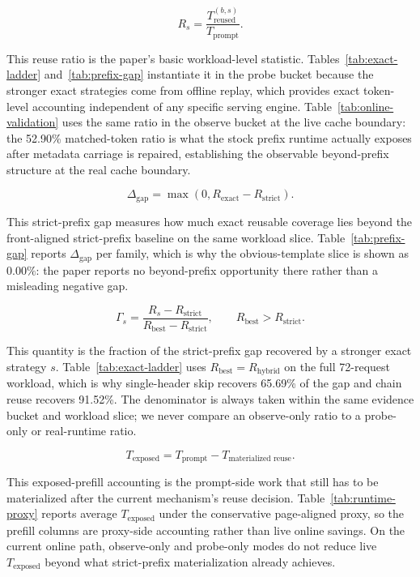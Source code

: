 \documentclass[conference]{IEEEtran}
\begin{document}
\[
R_s = \frac{T_{\text{reused}}^{(b,s)}}{T_{\text{prompt}}}.
\]

This reuse ratio is the paper's basic workload-level statistic. Tables~\ref{tab:exact-ladder} and~\ref{tab:prefix-gap} instantiate it in the probe bucket because the stronger exact strategies come from offline replay, which provides exact token-level accounting independent of any specific serving engine. Table~\ref{tab:online-validation} uses the same ratio in the observe bucket at the live cache boundary: the 52.90\% matched-token ratio is what the stock prefix runtime actually exposes after metadata carriage is repaired, establishing the observable beyond-prefix structure at the real cache boundary.

\[
\Delta_{\text{gap}} = \max\left(0, R_{\text{exact}} - R_{\text{strict}}\right).
\]

This strict-prefix gap measures how much exact reusable coverage lies beyond the front-aligned strict-prefix baseline on the same workload slice. Table~\ref{tab:prefix-gap} reports $\Delta_{\text{gap}}$ per family, which is why the obvious-template slice is shown as $0.00\%$: the paper reports no beyond-prefix opportunity there rather than a misleading negative gap.

\[
\Gamma_s = \frac{R_s - R_{\text{strict}}}{R_{\text{best}} - R_{\text{strict}}}, \qquad R_{\text{best}} > R_{\text{strict}}.
\]

This quantity is the fraction of the strict-prefix gap recovered by a stronger exact strategy $s$. Table~\ref{tab:exact-ladder} uses $R_{\text{best}} = R_{\text{hybrid}}$ on the full 72-request workload, which is why single-header skip recovers 65.69\% of the gap and chain reuse recovers 91.52\%. The denominator is always taken within the same evidence bucket and workload slice; we never compare an observe-only ratio to a probe-only or real-runtime ratio.

\[
T_{\text{exposed}} = T_{\text{prompt}} - T_{\text{materialized reuse}}.
\]

This exposed-prefill accounting is the prompt-side work that still has to be materialized after the current mechanism's reuse decision. Table~\ref{tab:runtime-proxy} reports average $T_{\text{exposed}}$ under the conservative page-aligned proxy, so the prefill columns are proxy-side accounting rather than live online savings. On the current online path, observe-only and probe-only modes do not reduce live $T_{\text{exposed}}$ beyond what strict-prefix materialization already achieves.
\end{document}
